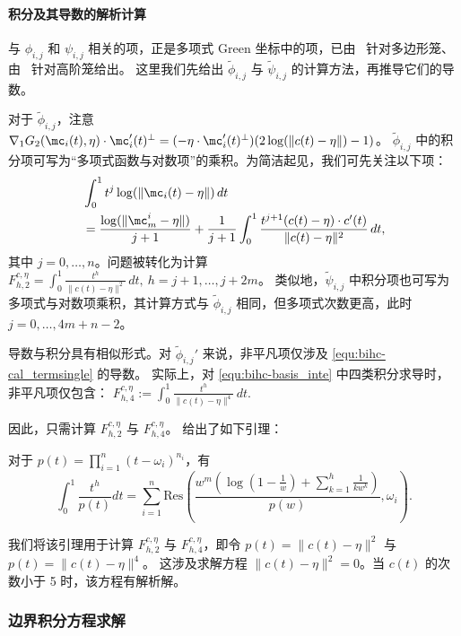 \paragraph{积分及其导数的解析计算}
与 \(\phi_{i,j}\) 和 \(\psi_{i,j}\) 相关的项，正是多项式 Green 坐标中的项，已由~\cite{MichelThiery2023} 针对多边形笼、由~\cite{liu2024polygc} 针对高阶笼给出。
这里我们先给出 \(\tilde{\phi}_{i,j}\) 与 \(\tilde{\psi}_{i,j}\) 的计算方法，再推导它们的导数。

对于 \(\tilde{\phi}_{i,j}\)，注意
\(\nabla_1 G_2(\mc_i(t),\eta) \cdot \mc_i'(t)^{\perp} = (-\eta \cdot \mc_i'(t)^{\perp})(2 \log(\| c(t) - \eta\|) - 1)\)。
\(\tilde{\phi}_{i,j}\) 中的积分项可写为“多项式函数与对数项”的乘积。为简洁起见，我们可先关注以下项：
\begin{equation}\label{equ:bihc-cal_termsingle}
\begin{aligned}
    &\int_0^1 t^j \log(\|\mc_i(t) - \eta \|)\, dt \\
    &= \frac{\log(\|\mc^i_{m} - \eta\|)}{j+1} + \frac{1}{j+1}\int_0^1 \frac{t^{j+1}(c(t)-\eta)\cdot c'(t)}{\|c(t)-\eta\|^2}\, dt,
\end{aligned}
\end{equation}
其中 \(j = 0, \dots, n\)。问题被转化为计算
$F_{h,2}^{c,\eta}=\int_0^1\frac{t^h}{\|c(t)-\eta \|^2}\,dt,\ h=j+1,\dots,j+2m$。
类似地，\(\tilde{\psi}_{i,j}\) 中积分项也可写为多项式与对数项乘积，其计算方式与 \(\tilde{\phi}_{i,j}\) 相同，但多项式次数更高，此时 \(j = 0, \dots, 4m + n - 2\)。

导数与积分具有相似形式。对 \(\tilde{\phi}_{i,j}'\) 来说，非平凡项仅涉及 \eqref{equ:bihc-cal_termsingle} 的导数。
实际上，对 \eqref{equ:bihc-basis_inte} 中四类积分求导时，非平凡项仅包含：
$
F_{h,4}^{c,\eta} := \int_0^1 \frac{t^h}{\|c(t) - \eta \|^4} \, dt.
$

因此，只需计算 \(F_{h,2}^{c,\eta}\) 与 \(F_{h,4}^{c,\eta}\)。\citet{liu2024polygc} 给出了如下引理：
\begin{lemma}
对于 \(p(t) = \prod_{i=1}^{n} (t - \omega_i)^{n_i}\)，有
\[
\int_0^1 \frac{t^h}{p(t)} dt = \sum_{i=1}^{n} \text{Res}\left(\frac{w^m \left( \log\left(1 - \frac{1}{w}\right) + \sum_{k=1}^h \frac{1}{k w^k} \right)}{p(w)}, \omega_i\right).
\]
\end{lemma}
我们将该引理用于计算 \(F_{h,2}^{c,\eta}\) 与 \(F_{h,4}^{c,\eta}\)，即令
$p(t)=\|c(t) - \eta \|^2$ 与 $p(t)=\|c(t) - \eta \|^4$。
这涉及求解方程 \(\|c(t)-\eta\|^2=0\)。当 \(c(t)\) 的次数小于 5 时，该方程有解析解。

\subsubsection{边界积分方程求解}
